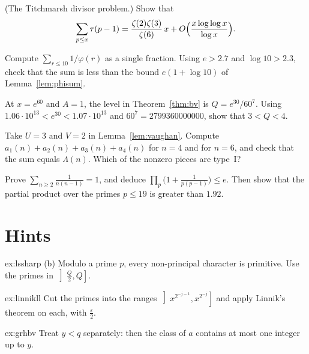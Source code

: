 \begin{exercise}[$\star\star\star$]\label{ex:titchmarsh}
(The Titchmarsh divisor problem.) Show that
\[
\sum_{p\le x}\tau(p-1)=\frac{\zeta(2)\zeta(3)}{\zeta(6)}\,x+O\Bigl(\frac{x\log\log x}{\log x}\Bigr).
\]
\end{exercise}

\begin{exercise}[$\star$]\label{ex:v14-extra-04-1}
Compute $\sum_{r\le10}1/\varphi(r)$ as a single fraction. Using $e>2.7$ and $\log10>2.3$, check that the sum is less than the bound $e(1+\log10)$ of Lemma~\ref{lem:phisum}.
\end{exercise}

\begin{exercise}[$\star$]\label{ex:v14-extra-04-2}
At $x=e^{60}$ and $A=1$, the level in Theorem~\ref{thm:bv} is $Q=e^{30}/60^7$. Using $1.06\cdot10^{13}<e^{30}<1.07\cdot10^{13}$ and $60^7=2799360000000$, show that $3<Q<4$.
\end{exercise}

\begin{exercise}[$\star\star$]\label{ex:v14-extra-04-3}
Take $U=3$ and $V=2$ in Lemma~\ref{lem:vaughan}. Compute $a_1(n)+a_2(n)+a_3(n)+a_4(n)$ for $n=4$ and for $n=6$, and check that the sum equals $\Lambda(n)$. Which of the nonzero pieces are type~I?
\end{exercise}

\begin{exercise}[$\star\star$]\label{ex:v14-extra-04-4}
Prove $\sum_{n\ge2}\frac1{n(n-1)}=1$, and deduce $\prod_p\bigl(1+\frac1{p(p-1)}\bigr)\le e$. Then show that the partial product over the primes $p\le19$ is greater than $1.92$.
\end{exercise}

\section{Hints}

\begin{hint}{ex:lssharp}
(b) Modulo a prime $p$, every non-principal character is primitive. Use the primes in $\left]\frac Q2,Q\right]$.
\end{hint}

\begin{hint}{ex:linnikll}
Cut the primes into the ranges $\left]x^{2^{-j-1}},x^{2^{-j}}\right]$ and apply Linnik's theorem on each, with $\frac\varepsilon2$.
\end{hint}

\begin{hint}{ex:grhbv}
Treat $y<q$ separately: then the class of $a$ contains at most one integer up to $y$.
\end{hint}

